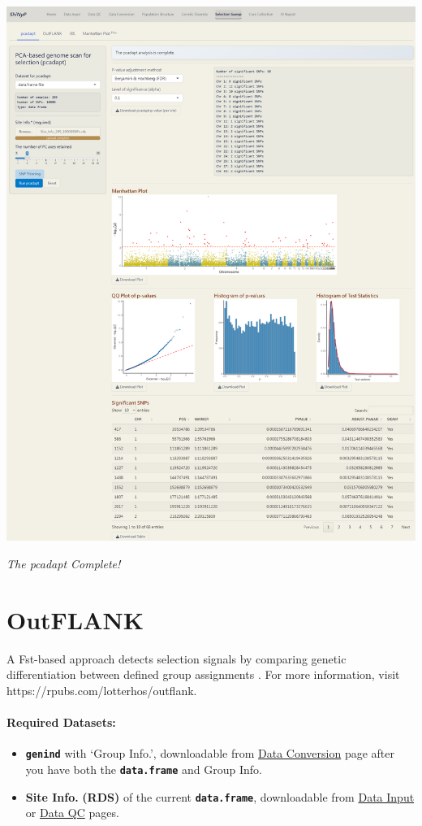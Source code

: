 \documentclass[
]{book}
\providecommand{\tightlist}{%
  \setlength{\itemsep}{0pt}\setlength{\parskip}{0pt}}
\begin{document}
\includegraphics{images/clipboard-1914990218.png}

\emph{The pcadapt Complete!}

\section{OutFLANK}\label{outflank}

A Fst-based approach detects selection signals by comparing genetic differentiation between defined group assignments \citep{whitlock2015}. For more information, visit https://rpubs.com/lotterhos/outflank.

\paragraph*{Required Datasets:}\label{required-datasets-2}

\begin{itemize}
\tightlist
\item
  {\textbf{\texttt{genind}}} with `Group Info.', downloadable from \ul{Data Conversion} page after you have both the {\textbf{\texttt{data.frame}}} and Group Info.
\item
  \textbf{Site Info.} \textbf{(RDS)} of the current {\textbf{\texttt{data.frame}}}, downloadable from \ul{Data Input} or \ul{Data QC} pages.
\end{itemize}
\end{document}
